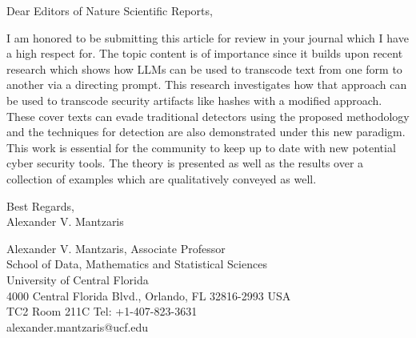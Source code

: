 \documentclass{article}
\begin{document}
\noindent Dear Editors of Nature Scientific Reports,
\vspace{.5cm}

\indent I am honored to be submitting this article for review in your journal which I have a high respect for.
The topic content is of importance since it builds upon recent research which shows how LLMs can be used to transcode text from one form to another via a directing prompt.
This research investigates how that approach can be used to transcode security artifacts like hashes with a modified approach. These cover texts can evade traditional detectors using the proposed methodology and the techniques for detection are also demonstrated under this new paradigm. This work is essential for the community to keep up to date with new potential cyber security tools. The theory is presented as well as the results over a collection of examples which are qualitatively conveyed as well.

\vspace{.5cm}

\noindent Best Regards,\\
Alexander V. Mantzaris

\vspace{.5cm}

\noindent Alexander V. Mantzaris, Associate Professor \\
School of Data, Mathematics and Statistical Sciences\\
University of Central Florida\\
4000 Central Florida Blvd., Orlando, FL 32816-2993 USA\\
TC2 Room 211C Tel: +1-407-823-3631 \\
alexander.mantzaris@ucf.edu
\end{document}
